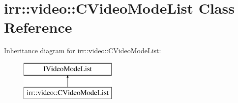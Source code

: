 \hypertarget{classirr_1_1video_1_1_c_video_mode_list}{\section{irr\-:\-:video\-:\-:C\-Video\-Mode\-List Class Reference}
\label{classirr_1_1video_1_1_c_video_mode_list}
}
Inheritance diagram for irr\-:\-:video\-:\-:C\-Video\-Mode\-List\-:\begin{figure}[H]
\begin{center}
\leavevmode
\includegraphics[height=2.000000cm]{classirr_1_1video_1_1_c_video_mode_list}
\end{center}
\end{figure}
